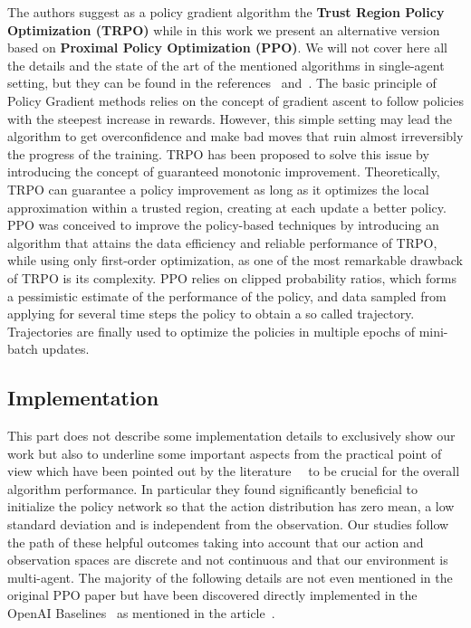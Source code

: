 \documentclass[11pt, a4paper, hidelinks]{report}
\begin{document}
The authors suggest as a policy gradient algorithm the \textbf{Trust Region Policy Optimization (TRPO)} while in this work we present an alternative version based on \textbf{Proximal Policy Optimization (PPO)}.
We will not cover here all the details and the state of the art of the mentioned algorithms in single-agent setting, but they can be found in the references~\citep{trpo} and~\citep{ppo}.
The basic principle of Policy Gradient methods relies on the concept of gradient ascent to follow policies with the steepest increase in rewards.
However, this simple setting may lead the algorithm to get overconfidence and make bad moves that ruin almost irreversibly the progress of the training.
TRPO has been proposed to solve this issue by introducing the concept of guaranteed monotonic improvement.
Theoretically, TRPO can guarantee a policy improvement as long as it optimizes the local approximation within a trusted region, creating at each update a better policy.
PPO was conceived to improve the policy-based techniques by introducing an algorithm that attains the data efficiency and reliable performance of TRPO, while using only first-order optimization, as one of the most remarkable drawback of TRPO is its complexity.
PPO relies on clipped probability ratios, which forms a pessimistic estimate of the performance of the policy, and data sampled from applying for several time steps the policy to obtain a so called trajectory.
Trajectories are finally used to optimize the policies in multiple epochs of mini-batch updates.

\subsection{Implementation}\label{subsec:implementation}

This part does not describe some implementation details to exclusively show our work but also to underline some important aspects from the practical point of view which have been pointed out by the literature~\citep{ppo_implementation_1}~\citep{ppo_implementation_2} to be crucial for the overall algorithm performance.
In particular they found significantly beneficial to initialize the policy network so that the action distribution has zero mean, a low standard deviation and is independent from the observation.
Our studies follow the path of these helpful outcomes taking into account that our action and observation spaces are discrete and not continuous and that our environment is multi-agent.
The majority of the following details are not even mentioned in the original PPO paper but have been discovered directly implemented in the OpenAI Baselines~\citep{ppo_baselines} as mentioned in the article~\citep{ppo-32-implementations-details}.
\end{document}
